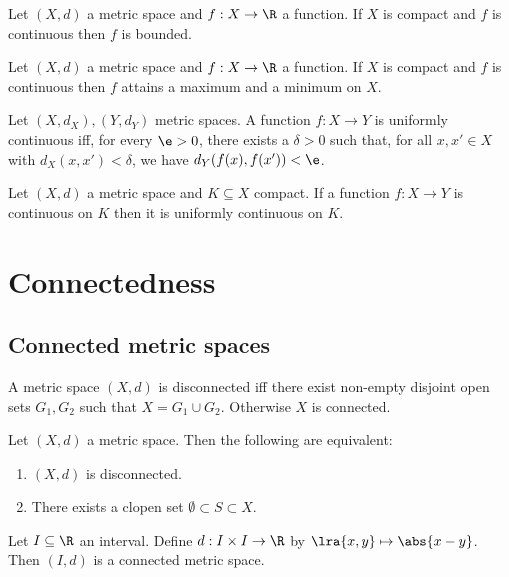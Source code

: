 \documentclass{article}
\begin{document}
\begin{proposition}[9.22]
	Let $(X,d)$ a metric space and $f:X\to\R$ a function.
	If $X$ is compact and $f$ is continuous then $f$ is bounded.
\end{proposition}

\begin{proposition}[9.23]
	Let $(X,d)$ a metric space and $f:X\to\R$ a function. If $X$ is compact
	and $f$ is continuous then $f$ attains a maximum and a minimum on $X$.
\end{proposition}

\begin{definition}
	Let $(X,d_X),(Y,d_Y)$ metric spaces. A function $f:X\to Y$ is
	uniformly continuous iff, for every $\e>0$, there exists a $\delta>0$ such that,
	for all $x,x'\in X$ with $d_X(x,x')<\delta$, we have $d_Y(f(x),f(x'))<\e$.
\end{definition}

\begin{proposition}[9.26]
	Let $(X,d)$ a metric space and $K\subseteq X$ compact. If a function $f:X\to Y$
	is continuous on $K$ then it is uniformly continuous on $K$.
\end{proposition}

\section{Connectedness}

\subsection{Connected metric spaces}

\begin{definition}
	A metric space $(X,d)$ is disconnected iff there exist non-empty disjoint open sets
	$G_1,G_2$ such that $X=G_1\cup G_2$. Otherwise $X$ is connected.
\end{definition}

\begin{lemma}[10.2]
	Let $(X,d)$ a metric space. Then the following are equivalent:
	\begin{enumerate}
		\item $(X,d)$ is disconnected.
		\item There exists a clopen set $\emptyset\subset S\subset X$.
	\end{enumerate}
\end{lemma}

\begin{proposition}[10.4]
	Let $I\subseteq\R$ an interval. Define $d:I\times I\to\R$ by $\lra{x,y}\mapsto\abs{x-y}$.
	Then $(I,d)$ is a connected metric space.
\end{proposition}
\end{document}
